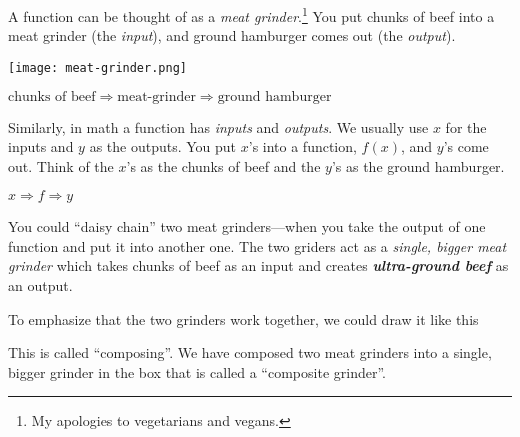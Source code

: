 \documentclass[fleqn,letterpaper,12pt,printwatermark=false]{memoir}
\begin{document}
\begin{myLesson}
    A function can be thought of as a \emph{meat grinder}.\footnote{
        My apologies to vegetarians and vegans.
    }
    You put chunks of beef into a meat grinder (the \emph{input}),
    and ground hamburger comes out (the \emph{output}). 

    \begin{center}
    \texttt{[image: meat-grinder.png]} 
    \end{center}

    \begin{center}
    \(
        \text{chunks of beef}
        \Longrightarrow
        \text{meat-grinder}
        \Longrightarrow
        \text{ground hamburger}
    \)
    \end{center}

    Similarly,
    in math a function has \emph{inputs} and \emph{outputs}.
    We usually use $x$ for the inputs and $y$ as the outputs.
    You put $x$'s into a function, $f(x)$,
    and $y$'s come out.
    Think of the $x$'s as the chunks of beef
    and the $y$'s as the ground hamburger.
    \begin{center}
    \(
        x
        \Longrightarrow
        f
        \Longrightarrow
        y
    \)
    \end{center}

    You could ``daisy chain'' two meat grinders---when 
    you take the output of one function and put it into
    another one.
    The two griders act as a  
    \emph{single, bigger meat grinder} which takes chunks of beef
    as an input and creates 
    {\bfseries\itshape ultra-ground beef} as an output.

    \begin{center}
    \end{center}
    To emphasize that the two grinders work together, 
    we could draw it like this
    \begin{center}
    \end{center}
    This is called ``composing''. 
    We have composed two meat grinders
    into a single, bigger grinder in the box that is called 
    a ``composite grinder''.


\end{myLesson}
\end{document}
